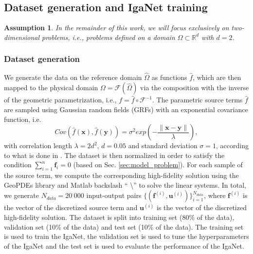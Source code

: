 \documentclass{article}
\newcommand{\R}{\mathbb{R}}
\theoremstyle{plain}
\newtheorem{ass}{Assumption}
\numberwithin{equation}{section}
\begin{document}
\subsection{Dataset generation and IgaNet training}\label{sec:experiments_rhs}
\begin{ass}
    In the remainder of this work, we will focus exclusively on two-dimensional problems, i.e., problems defined on a domain $\Omega \subset \R^d$ with $d=2$.
\end{ass}
\subsubsection{Dataset generation}\label{sec:dataset_generation}
We generate the data on the reference domain $\widehat{\Omega}$ as functions $\hat{f}$, which are then mapped to the physical domain $\Omega = \mathcal{F}(\widehat{\Omega})$ via the composition with the inverse of the geometric parametrization, i.e., $f = \hat{f} \circ \mathcal{F}^{-1}$. The parametric source terms $\hat{f}$ are sampled using Gaussian random fields (GRFs) \cite{adler2010geometry} with an exponential covariance function, i.e.
\begin{equation}
    Cov(\hat{f}(\mathbf{x}), \hat{f}(\mathbf{y})) = \sigma^2 exp\left(-\frac{\|\mathbf{x} - \mathbf{y}\|}{\lambda}\right),
    \label{eq:covariance}
\end{equation}
with correlation length $\lambda = 2d^2$, $d = 0.05$ and standard deviation $\sigma = 1$, according to what is done in \cite{kopanivcakova2025deeponet}.
The dataset is then normalized in order to satisfy the condition $\sum_{i=1}^{n} \mathbf{f}_i=0$ (based on Sec. \ref{sec:model_problem}). For each sample of the source term, we compute the corresponding high-fidelity solution using the GeoPDEs library \cite{de2011geopdes} and Matlab backslash “ \textbackslash”  to solve the linear systems. In total, we generate $N_{data} = 20^{\cdot}000$ input-output pairs $\{(\mathbf{f}^{(i)}, \mathbf{u}^{(i)})\}_{i=1}^{N_{data}}$, where $\mathbf{f}^{(i)}$ is the vector of the discretized source term and $\mathbf{u}^{(i)}$ is the vector of the discretized high-fidelity solution.
The dataset is split into training set (80\% of the data), validation set (10\% of the data) and test set (10\% of the data). The training set is used to train the IgaNet, the validation set is used to tune the hyperparameters of the IgaNet and the test set is used to evaluate the performance of the IgaNet.
\end{document}
